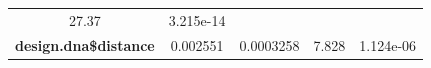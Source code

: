 \documentclass[]{article}
\begin{document}
\begin{longtable}[]{@{}ccccc@{}}
\begin{minipage}[t]{0.12\columnwidth}
27.37\strut
\end{minipage} & \begin{minipage}[t]{0.13\columnwidth}\centering\strut
3.215e-14\strut
\end{minipage}\tabularnewline
\begin{minipage}[t]{0.31\columnwidth}\centering\strut
\textbf{design.dna\$distance}\strut
\end{minipage} & \begin{minipage}[t]{0.13\columnwidth}\centering\strut
0.002551\strut
\end{minipage} & \begin{minipage}[t]{0.16\columnwidth}\centering\strut
0.0003258\strut
\end{minipage} & \begin{minipage}[t]{0.12\columnwidth}\centering\strut
7.828\strut
\end{minipage} & \begin{minipage}[t]{0.13\columnwidth}\centering\strut
1.124e-06\strut
\end{minipage}\tabularnewline
\bottomrule
\end{longtable}
\end{document}
